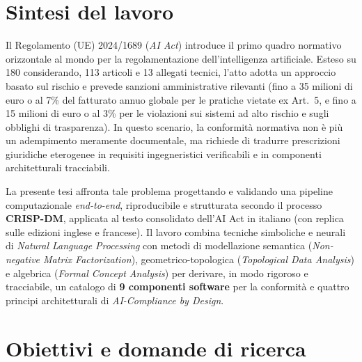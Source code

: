 \documentclass[12pt,a4paper,oneside]{article}
\begin{document}
\tableofcontents
\clearpage


\section{Sintesi del lavoro}

Il Regolamento (UE) 2024/1689 (\emph{AI Act}) introduce il primo quadro normativo orizzontale al mondo per la regolamentazione dell'intelligenza artificiale. Esteso su 180 considerando, 113 articoli e 13 allegati tecnici, l'atto adotta un approccio basato sul rischio e prevede sanzioni amministrative rilevanti (fino a 35 milioni di euro o al 7\% del fatturato annuo globale per le pratiche vietate ex Art.~5, e fino a 15 milioni di euro o al 3\% per le violazioni sui sistemi ad alto rischio e sugli obblighi di trasparenza). In questo scenario, la conformità normativa non è più un adempimento meramente documentale, ma richiede di tradurre prescrizioni giuridiche eterogenee in requisiti ingegneristici verificabili e in componenti architetturali tracciabili.

La presente tesi affronta tale problema progettando e validando una pipeline computazionale \emph{end-to-end}, riproducibile e strutturata secondo il processo \textbf{CRISP-DM}, applicata al testo consolidato dell'AI Act in italiano (con replica sulle edizioni inglese e francese). Il lavoro combina tecniche simboliche e neurali di \emph{Natural Language Processing} con metodi di modellazione semantica (\emph{Non-negative Matrix Factorization}), geometrico-topologica (\emph{Topological Data Analysis}) e algebrica (\emph{Formal Concept Analysis}) per derivare, in modo rigoroso e tracciabile, un catalogo di \textbf{9 componenti software} per la conformità e quattro principi architetturali di \emph{AI-Compliance by Design}.

\section{Obiettivi e domande di ricerca}
\end{document}
